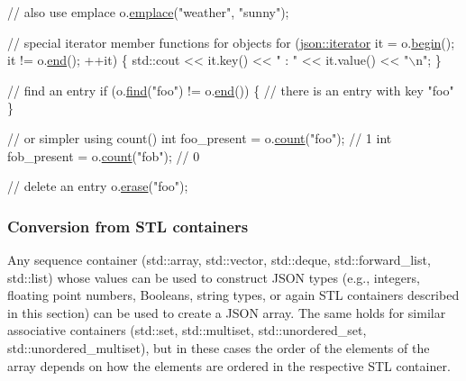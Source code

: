 \begin{DoxyCode}
\textcolor{comment}{// also use emplace}
o.\hyperlink{classnlohmann_1_1basic__json_a5338e282d1d02bed389d852dd670d98d}{emplace}(\textcolor{stringliteral}{"weather"}, \textcolor{stringliteral}{"sunny"});

\textcolor{comment}{// special iterator member functions for objects}
\textcolor{keywordflow}{for} (\hyperlink{classnlohmann_1_1detail_1_1iter__impl}{json::iterator} it = o.\hyperlink{classnlohmann_1_1basic__json_a0ff28dac23f2bdecee9564d07f51dcdc}{begin}(); it != o.\hyperlink{classnlohmann_1_1basic__json_a13e032a02a7fd8a93fdddc2fcbc4763c}{end}(); ++it) \{
  std::cout << it.key() << \textcolor{stringliteral}{" : "} << it.value() << \textcolor{stringliteral}{"\(\backslash\)n"};
\}

\textcolor{comment}{// find an entry}
\textcolor{keywordflow}{if} (o.\hyperlink{classnlohmann_1_1basic__json_a89eb3928f57903677051c80534be9cb1}{find}(\textcolor{stringliteral}{"foo"}) != o.\hyperlink{classnlohmann_1_1basic__json_a13e032a02a7fd8a93fdddc2fcbc4763c}{end}()) \{
  \textcolor{comment}{// there is an entry with key "foo"}
\}

\textcolor{comment}{// or simpler using count()}
\textcolor{keywordtype}{int} foo\_present = o.\hyperlink{classnlohmann_1_1basic__json_a0d74bfcf65662f1d66d14c34b0027098}{count}(\textcolor{stringliteral}{"foo"}); \textcolor{comment}{// 1}
\textcolor{keywordtype}{int} fob\_present = o.\hyperlink{classnlohmann_1_1basic__json_a0d74bfcf65662f1d66d14c34b0027098}{count}(\textcolor{stringliteral}{"fob"}); \textcolor{comment}{// 0}

\textcolor{comment}{// delete an entry}
o.\hyperlink{classnlohmann_1_1basic__json_a068a16e76be178e83da6a192916923ed}{erase}(\textcolor{stringliteral}{"foo"});
\end{DoxyCode}


\subsubsection*{Conversion from S\+TL containers}

Any sequence container ({\ttfamily std\+::array}, {\ttfamily std\+::vector}, {\ttfamily std\+::deque}, {\ttfamily std\+::forward\+\_\+list}, {\ttfamily std\+::list}) whose values can be used to construct J\+S\+ON types (e.\+g., integers, floating point numbers, Booleans, string types, or again S\+TL containers described in this section) can be used to create a J\+S\+ON array. The same holds for similar associative containers ({\ttfamily std\+::set}, {\ttfamily std\+::multiset}, {\ttfamily std\+::unordered\+\_\+set}, {\ttfamily std\+::unordered\+\_\+multiset}), but in these cases the order of the elements of the array depends on how the elements are ordered in the respective S\+TL container.


